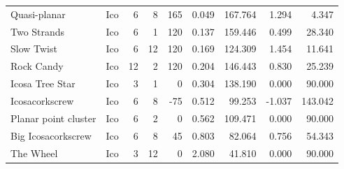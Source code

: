 \documentclass{svproc}
\begin{document}
\begin{table}[ht]
\begin{tabular}{l l r r r r r r r}
Quasi-planar & Ico &	6 &	8 &	165 &	0.049 &	167.764 & 1.294 & 4.347 \\
Two Strands & Ico &	6 &	1 &	120 &	0.137 &	159.446	& 0.499 & 28.340 \\
Slow Twist & Ico &	6 &	12 &	120 &	0.169 &	124.309	& 1.454	& 11.641 \\
Rock Candy & Ico &	12 &	2 &	120 &	0.204 &	146.443	& 0.830 & 25.239 \\
Icosa Tree Star & Ico &	3 &	1 &	0 &	0.304 &	138.190	& 0.000	& 90.000 \\
Icosacorkscrew & Ico &	6 &	8 &	-75 &	0.512 &	99.253	& -1.037 & 143.042 \\
Planar point cluster & Ico &	6 &	2 &	0 &	0.562 &	109.471 & 0.000 & 90.000 \\
Big Icosacorkscrew  & Ico &	6 &	8 &	45 &	0.803 &	82.064 & 0.756 & 54.343 \\
The Wheel & Ico &	3 &	12 &	0 &	2.080 &	41.810 & 0.000 & 90.000 \\
\hline %
\end{tabular}
\label{table:platonic} %
\end{table}
\end{document}
